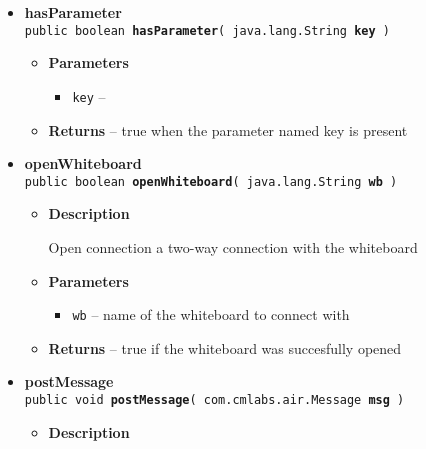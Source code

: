 {{{\begin{itemize}
{\begin{itemize}
{Get the parameter with type String
}
\item{
{\bf Parameters}
  \begin{itemize}
   \item{
{\tt key} -- }
  \end{itemize}
}%
\item{{\bf Returns} -- 
the parameter stored under key 
}%
\end{itemize}
}%
 \item{ 
{\bf hasParameter}\\
{\tt public boolean\ {\bf hasParameter}( {\tt java.lang.String} {\bf key} )
\label{amber.common.AirBrush.hasParameter(java.lang.String)}}%
\begin{itemize}
\item{
{\bf Parameters}
  \begin{itemize}
   \item{
{\tt key} -- }
  \end{itemize}
}%
\item{{\bf Returns} -- 
true when the parameter named key is present 
}%
\end{itemize}
}%
 \item{ 
{\bf openWhiteboard}\\
{\tt public boolean\ {\bf openWhiteboard}( {\tt java.lang.String} {\bf wb} )
\label{amber.common.AirBrush.openWhiteboard(java.lang.String)}}%
\begin{itemize}
\item{
{\bf Description}

Open connection a two-way connection with the whiteboard
}
\item{
{\bf Parameters}
  \begin{itemize}
   \item{
{\tt wb} -- name of the whiteboard to connect with}
  \end{itemize}
}%
\item{{\bf Returns} -- 
true if the whiteboard was succesfully opened 
}%
\end{itemize}
}%
 \item{ 
{\bf postMessage}\\
{\tt public void\ {\bf postMessage}( {\tt com.cmlabs.air.Message} {\bf msg} )
\label{amber.common.AirBrush.postMessage(com.cmlabs.air.Message)}}%
\begin{itemize}
\item{
{\bf Description}

}
\end{itemize}}
\end{itemize}}}}
